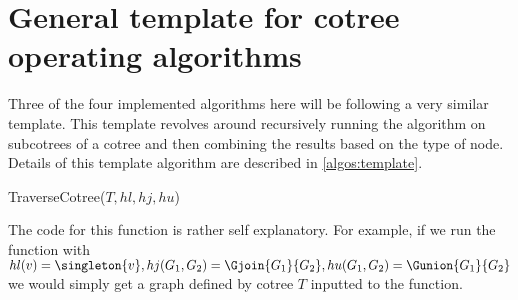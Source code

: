 \section{General template for cotree operating algorithms}

Three of the four implemented algorithms here will be following a very similar template. This template revolves around recursively running the algorithm on subcotrees of a cotree and then combining the results based on the type of node. Details of this template algorithm are described in \ref{algos:template}.


\begin{function}
    \caption{TraverseCotree($T, hl, hj, hu$)}
    \label{algos:template}
    \DontPrintSemicolon

\end{function}

The code for this function is rather self explanatory. For example, if we run the function with $hl(v) = \singleton{v}, hj(G_1, G_2) = \Gjoin{G_1}{G_2}, hu(G_1, G_2) = \Gunion{G_1}{G_2}$ we would simply get a graph defined by cotree $T$ inputted to the function.